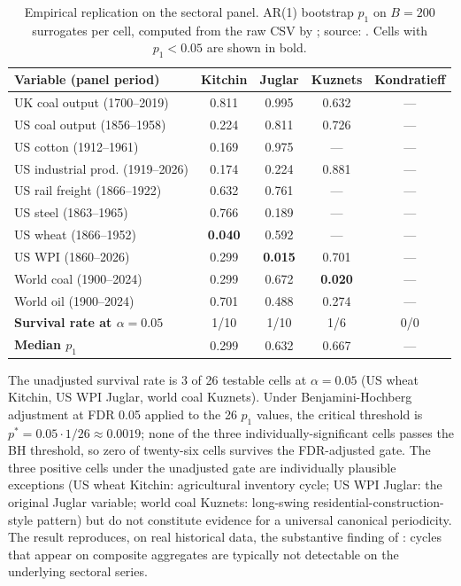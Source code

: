 \begin{table}[h]
\centering
\caption{Empirical \citet{wen2005} replication on the sectoral
panel. AR(1) bootstrap \(p_1\) on \(B=200\) surrogates per cell,
computed from the raw CSV by
; source:
. Cells with
\(p_1<0.05\) are shown in bold.}
\label{tab:wen_replication_p}
\small
\begin{tabularx}{\linewidth}{@{}X c c c c@{}}
\toprule
\textbf{Variable (panel period)} & \textbf{Kitchin} & \textbf{Juglar} & \textbf{Kuznets} & \textbf{Kondratieff} \\
\midrule
UK coal output       (1700--2019)  & 0.811 & 0.995 & 0.632 & --- \\
US coal output       (1856--1958)  & 0.224 & 0.811 & 0.726 & --- \\
US cotton            (1912--1961)  & 0.169 & 0.975 & ---   & --- \\
US industrial prod.  (1919--2026)  & 0.174 & 0.224 & 0.881 & --- \\
US rail freight      (1866--1922)  & 0.632 & 0.761 & ---   & --- \\
US steel             (1863--1965)  & 0.766 & 0.189 & ---   & --- \\
US wheat             (1866--1952)  & \textbf{0.040} & 0.592 & ---   & --- \\
US WPI               (1860--2026)  & 0.299 & \textbf{0.015} & 0.701 & --- \\
World coal           (1900--2024)  & 0.299 & 0.672 & \textbf{0.020} & --- \\
World oil            (1900--2024)  & 0.701 & 0.488 & 0.274 & --- \\
\midrule
\textbf{Survival rate at \(\alpha=0.05\)} & 1/10 & 1/10 & 1/6 & 0/0 \\
\textbf{Median \(p_1\)}                   & 0.299 & 0.632 & 0.667 & --- \\
\bottomrule
\end{tabularx}
\end{table}

The unadjusted survival rate is 3 of 26 testable cells at
\(\alpha=0.05\) (US wheat Kitchin, US WPI Juglar, world coal
Kuznets). Under Benjamini-Hochberg adjustment at FDR 0.05
applied to the 26 \(p_1\) values, the critical threshold is
\(p^* = 0.05\cdot 1/26 \approx 0.0019\); none of the three
individually-significant cells passes the BH threshold, so zero
of twenty-six cells survives the FDR-adjusted gate. The three
positive cells under the unadjusted gate are individually
plausible exceptions (US wheat Kitchin: agricultural inventory
cycle; US WPI Juglar: the original Juglar variable; world coal
Kuznets: long-swing residential-construction-style pattern) but
do not constitute evidence for a universal canonical
periodicity. The result reproduces, on real historical data,
the substantive finding of \citet{wen2005}: cycles that appear
on composite aggregates are typically not detectable on the
underlying sectoral series.

